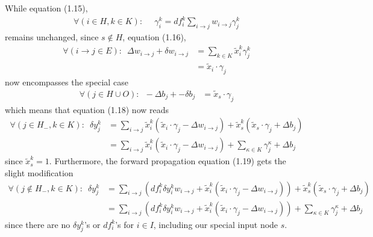 \documentclass[12pt]{article}
\renewcommand{\ij}{i \rightarrow j}
\begin{document}
While equation (1.15),
\begin{align}
\forall (i \in H, k \in K): & \,\,\, \gamma_i^k = df_i^k \sum_{i \rightarrow j} w_{i \rightarrow j} \gamma_j^k
\end{align}
remains unchanged, since $s \not\in H$, equation (1.16),
\begin{align}
\forall (\ij \in E): \,\,\, \Delta w_{\ij} + \delta w_{\ij}
& = \sum_{k \in K} \tilde{x}_i^k \gamma_{j}^k \\
& = \tilde{x}_i \cdot \gamma_j
\end{align}
now encompasses the special case
\begin{align}
\forall (j \in H \cup O): \,\,\, -\Delta b_j + -\delta b_j 
& = \tilde{x}_s \cdot \gamma_j
\end{align}
which means that equation (1.18) now reads
\begin{align}
\forall (j \in H_-, k \in K): \,\,\, \delta y_j^k
& = \sum_{\ij} \tilde{x}_i^k (\tilde{x}_i \cdot \gamma_j - \Delta w_{\ij})
+ \tilde{x}_s^k (\tilde{x}_s \cdot \gamma_j + \Delta b_j) \\
& = \sum_{\ij} \tilde{x}_i^k (\tilde{x}_i \cdot \gamma_j - \Delta w_{\ij})
+ \sum_{\kappa \in K} \gamma_j^\kappa + \Delta b_j
\end{align}
since $\tilde{x}_s^k = 1$.
Furthermore, the forward propagation equation (1.19) gets the slight modification
\begin{align}
\forall (j \not\in H_-, k \in K): \,\,\, \delta y_j^k & = 
\sum_{\ij} (df_i^k \delta y_i^k w_{\ij} + \tilde{x}_i^k (\tilde{x}_i \cdot \gamma_j - \Delta w_{\ij}) ) 
+ \tilde{x}_s^k (\tilde{x}_s \cdot \gamma_j + \Delta b_j) \\
& = \sum_{\ij} (df_i^k \delta y_i^k w_{\ij} + \tilde{x}_i^k (\tilde{x}_i \cdot \gamma_j - \Delta w_{\ij}) ) 
+ \sum_{\kappa \in K} \gamma_j^\kappa + \Delta b_j
\end{align}
since there are no $\delta y_j^k$'s or $df_i^k$'s for $i \in I$, including our special input node $s$.




{}

\end{document}
